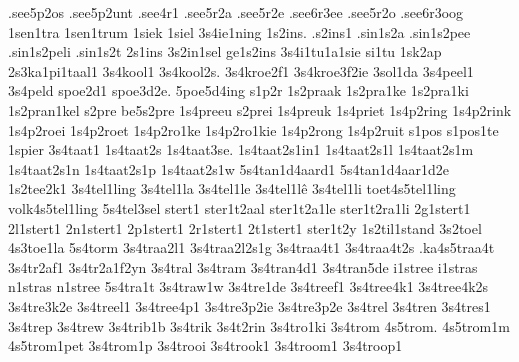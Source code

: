 {.see5p2os
.see5p2unt
.see4r1
.see5r2a
.see5r2e
.see6r3ee
.see5r2o
.see6r3oog
%
1sen1tra
1sen1trum
%
1siek
1siel
%
3s4ie1ning
%
1s2ins.
.s2ins1
.sin1s2a
.sin1s2pee
.sin1s2peli
.sin1s2t
2s1ins
3s2in1sel
ge1s2ins
%
3s4i1tu1a1sie
si1tu
%
1sk2ap
2s3ka1pi1taal1
%
3s4kool1
3s4kool2s.
%
3s4kroe2f1
3s4kroe3f2ie
%
3sol1da
%
3s4peel1
%
3s4peld
%
spoe2d1
spoe3d2e.
5poe5d4ing
%
s1p2r
1s2praak
1s2pra1ke
1s2pra1ki
1s2pran1kel
s2pre
be5s2pre
1s4preeu
s2prei
1s4preuk
1s4priet
1s4p2ring
1s4p2rink
1s4p2roei
1s4p2roet
1s4p2ro1ke
1s4p2ro1kie
1s4p2rong
1s4p2ruit
%
s1pos
s1pos1te
%
1spier
%
3s4taat1
1s4taat2s
1s4taat3se.
1s4taat2s1in1
1s4taat2s1l
1s4taat2s1m
1s4taat2s1n
1s4taat2s1p
1s4taat2s1w
%
5s4tan1d4aard1
5s4tan1d4aar1d2e
1s2tee2k1
3s4tel1ling
3s4tel1la
3s4tel1le
3s4tel1lê
3s4tel1li
toet4s5tel1ling
volk4s5tel1ling
5s4tel3sel
stert1
ster1t2aal
ster1t2a1le
ster1t2ra1li
2g1stert1
2l1stert1
2n1stert1
2p1stert1
2r1stert1
2t1stert1
ster1t2y
1s2til1stand
3s2toel
4s3toe1la
5s4torm
3s4traa2l1
3s4traa2l2s1g
3s4traa4t1
3s4traa4t2s
.ka4s5traa4t
3s4tr2af1
3s4tr2a1f2yn
3s4tral
3s4tram
3s4tran4d1
3s4tran5de
i1stree
i1stras
n1stras
n1stree
5s4tra1t
3s4traw1w
3s4tre1de
3s4treef1
3s4tree4k1
3s4tree4k2s
3s4tre3k2e
3s4treel1
3s4tree4p1
3s4tre3p2ie
3s4tre3p2e
3s4trel
3s4tren
3s4tres1
3s4trep
3s4trew
3s4trib1b
3s4trik
3s4t2rin
3s4tro1ki
3s4trom
4s5trom.
4s5trom1m
4s5trom1pet
3s4trom1p
3s4trooi
3s4trook1
3s4troom1
3s4troop1
}
